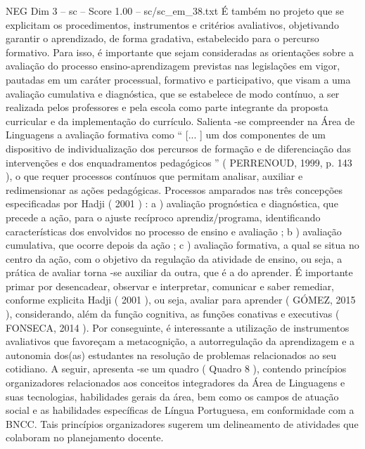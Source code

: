 \begin{textsample}{NEG Dim 3 – sc – Score 1.00 – sc/sc\_em\_38.txt}  \label{ex:f3_neg_221}
É também no projeto que se explicitam os procedimentos, instrumentos e critérios avaliativos, objetivando garantir o aprendizado, de forma gradativa, estabelecido para o percurso formativo.
Para isso, é importante que sejam consideradas as orientações sobre a avaliação do processo ensino-aprendizagem previstas nas legislações em vigor, pautadas em um caráter processual, formativo e participativo, que visam a uma avaliação cumulativa e diagnóstica, que se estabelece de modo contínuo, a ser realizada pelos professores e pela escola como parte integrante da proposta curricular e da implementação do currículo.
Salienta -se compreender na Área de Linguagens a avaliação formativa como “ [... ] um dos componentes de um dispositivo de individualização dos percursos de formação e de diferenciação das intervenções e dos enquadramentos pedagógicos ” ( PERRENOUD, 1999, p. 143 ), o que requer processos contínuos que permitam analisar, auxiliar e redimensionar as ações pedagógicas.
Processos amparados nas três concepções especificadas por Hadji ( 2001 ) : a ) avaliação prognóstica e diagnóstica, que precede a ação, para o ajuste recíproco aprendiz/programa, identificando características dos envolvidos no processo de ensino e avaliação ; b ) avaliação cumulativa, que ocorre depois da ação ; c ) avaliação formativa, a qual se situa no centro da ação, com o objetivo da regulação da atividade de ensino, ou seja, a prática de avaliar torna -se auxiliar da outra, que é a do aprender.
É importante primar por desencadear, observar e interpretar, comunicar e saber remediar, conforme explicita Hadji ( 2001 ), ou seja, avaliar para aprender ( GÓMEZ, 2015 ), considerando, além da função cognitiva, as funções conativas e executivas ( FONSECA, 2014 ).
Por conseguinte, é interessante a utilização de instrumentos avaliativos que favoreçam a metacognição, a autorregulação da aprendizagem e a autonomia dos(as) estudantes na resolução de problemas relacionados ao seu cotidiano.
A seguir, apresenta -se um quadro ( Quadro 8 ), contendo princípios organizadores relacionados aos conceitos integradores da Área de Linguagens e suas tecnologias, habilidades gerais da área, bem como os campos de atuação social e as habilidades específicas de Língua Portuguesa, em conformidade com a BNCC.
Tais princípios organizadores sugerem um delineamento de atividades que colaboram no planejamento docente.

\end{textsample}
